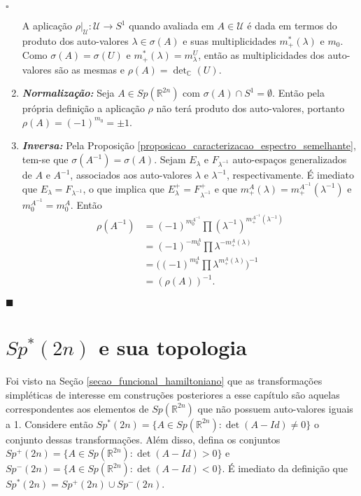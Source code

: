\documentclass[12pt]{book}
\newenvironment{prova}[1]{$\square$ #1}{\hfill$\blacksquare$}
\newcommand{\autoespaco}[1]{E_{#1}}
\newcommand{\bigparenteses}[1]{\Big( #1 \Big) }
\newcommand{\circulo}{S^{1}}
\newcommand{\complexo}[1]{\mathbb{C}^{#1}}
\newcommand{\espectrooperador}[1]{\sigma(#1)}
\newcommand{\gruposimpletico}[1]{Sp(#1)}
\newcommand{\gruposimpleticonaodegenerado}[1]{Sp^{#1}(2n)}
\newcommand{\real}[1]{\mathbb{R}^{#1}}
\begin{document}
\begin{prova}
\begin{enumerate}
			A aplicação $\rho|_{\mathcal{U}}: \mathcal{U} \to \circulo$ quando avaliada em $A\in \mathcal{U}$ é dada em termos do produto dos auto-valores $\lambda \in \espectrooperador{A}$ e suas multiplicidades $m^{*}_{+}(\lambda)$ e $m_{0}$. Como $\espectrooperador{A} = \espectrooperador{U}$ e $m^{*}_{+}(\lambda)  = m_{\lambda}^{U}$, então as multiplicidades dos auto-valores são as mesmas e $\rho(A)=\det_{\complexo{}}(U)$.
			
			\item \textbf{\textit{Normalização:}} Seja $A\in \gruposimpletico{\real{2n}}$ com $\sigma(A)\cap \circulo = \emptyset$. Então pela própria definição a aplicação $\rho$ não terá produto dos auto-valores, portanto $\rho(A) = (-1)^{m_{0}} = \pm 1$. 
			
			\item \textbf{\textit{Inversa:}} Pela Proposição  \ref{proposicao_caracterizacao_espectro_semelhante}, tem-se que $\espectrooperador{A^{-1}} = \espectrooperador{A}$. Sejam $\autoespaco{\lambda}$ e $F_{\lambda^{-1}}$ auto-espaços generalizados de $A$ e $A^{-1}$, associados aos auto-valores $\lambda$ e $\lambda^{-1}$, respectivamente. É imediato que $\autoespaco{\lambda} = F_{\lambda^{-1}}$, o que implica que $\autoespaco{\lambda}^{+} = F_{\lambda^{-1}}^{+}$ e que $m^{A}_{+}(\lambda) = m^{A^{-1}}_{+}(\lambda^{-1})$ e $m_0^{A^{-1}}=m_0^A$. Então
			$$
			\begin{aligned}
			\rho(A^{-1})
			&= (-1)^{m_0^{A^{-1}}}\prod (\lambda^{-1})^{m_{+}^{A^{-1}}(\lambda^{-1})}
			\\
			&=(-1)^{-m_0^{A}}\prod \lambda^{-m_{+}^{A}(\lambda)}
			\\
			&=\bigparenteses{(-1)^{m_{0}^{A}}\prod \lambda^{m_{+}^{A}(\lambda)}}^{-1}
			\\
			&=(\rho(A)) ^{-1}.
			\end{aligned}
			$$
		\end{enumerate}
	\end{prova}
	
	\section{$\gruposimpleticonaodegenerado{*}$ e sua topologia}
	
	Foi visto na Seção \ref{secao_funcional_hamiltoniano} que as transformações simpléticas de interesse em construções posteriores a esse capítulo são aquelas correspondentes aos elementos de $\gruposimpletico{\real{2n}}$ que não possuem auto-valores iguais a 1. Considere então $\gruposimpleticonaodegenerado{*}= \{ A \in \gruposimpletico{\real{2n}}: \det(A-Id)\neq 0 \}$ o conjunto dessas transformações. Além disso, defina os conjuntos $\gruposimpleticonaodegenerado{+}= \{ A \in \gruposimpletico{\real{2n}}: \det(A-Id)> 0 \}$ e $\gruposimpleticonaodegenerado{-}= \{ A \in \gruposimpletico{\real{2n}}: \det(A-Id)<0 \}$. É imediato da definição que $\gruposimpleticonaodegenerado{*}= \gruposimpleticonaodegenerado{+} \cup \gruposimpleticonaodegenerado{-} $.
	
\end{document}
